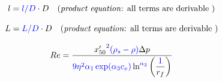 \documentclass[12pt,reqno,intlimits,twoside]{amsart}
\begin{document}
\begin{equation}\label{EqlD} %
   l = \textcolor{blue}{l/D} \cdot D%
   \quad\text{(\emph{product equation}: all terms are derivable )}
\end{equation}

\begin{equation}\label{EqLD} %
   L = \textcolor{blue}{L/D} \cdot D%
   \quad\text{(\emph{product equation}: all terms are derivable )}
\end{equation}

\begin{equation}\label{EqReDpRf} %
   Re = \dfrac{{x'_{50}}^{2}\textcolor{blue}{(\rho_s - \rho)}\Delta p}%
              {\textcolor{blue}{9\eta^2\alpha_1\exp(\alpha_3 c_v)}%
               \ln^{\textcolor{blue}{\alpha_2}}\left(\dfrac{\textcolor{blue}{1}}{r_f}\right)
              }
\end{equation}
\end{document}
